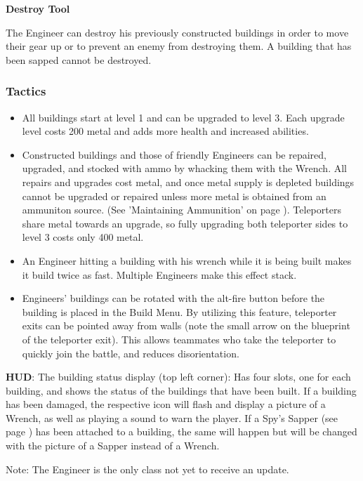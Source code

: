{\bf Destroy Tool}

 The Engineer can destroy his previously constructed buildings in order to move their gear up or to prevent an enemy from destroying them. A building that has been sapped cannot be destroyed.


\subsubsection {Tactics}
\begin {itemize}

\item All buildings start at level 1 and can be upgraded to level 3.  Each upgrade level costs 200 metal and adds more health and increased abilities.

\item Constructed buildings and those of friendly Engineers can be repaired, upgraded, and stocked with ammo by whacking them with the Wrench.  All repairs and upgrades cost metal, and once metal supply is depleted buildings cannot be upgraded or repaired unless more metal is obtained from an ammuniton source.  (See 'Maintaining Ammunition' on page \pageref{Maintaining_Ammunition}). Teleporters share metal towards an upgrade, so fully upgrading both teleporter sides to level 3 costs only 400 metal.

\item An Engineer hitting a building with his wrench while it is being built makes it build twice as fast. Multiple Engineers make this effect stack.

\item Engineers' buildings can be rotated with the alt-fire button before the building is placed in the Build Menu. By utilizing this feature, teleporter exits can be pointed away from walls (note the small arrow on the blueprint of the teleporter exit). This allows teammates who take the teleporter to quickly join the battle, and reduces disorientation.
\end {itemize}
{\bf HUD}:
The building status display (top left corner): Has four slots, one for each building, and shows the status of the buildings that have been built. If a building has been damaged, the respective icon will  flash and display a picture of a Wrench, as well as playing a sound to warn the player. If a Spy's Sapper (see page \pageref{sapper}) has been attached to a building, the same will happen but will be changed with the picture of a Sapper instead of a Wrench.
 
Note: The Engineer is the only class not yet to receive an update.